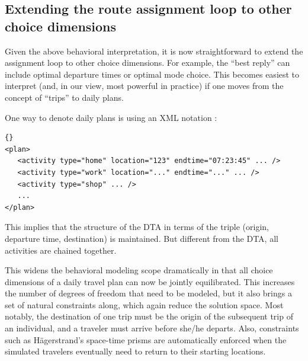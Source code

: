 
\subsection{Extending the route assignment loop to other choice
  dimensions}
\label{sec:extend-route-assignm}

Given the above behavioral interpretation, it is now straightforward
to extend the assignment loop to other choice dimensions.  For
example, the ``best reply'' can include optimal departure times
\citep[e.g.][]{METROPOLIS,EttemaEtcRoutes-timesIatbr03} or optimal mode
choice.  This becomes easiest to interpret (and, in our view, most
powerful in practice) if one moves from the concept of ``trips'' to
daily plans.

One way to denote daily plans is using an
XML notation \citep[][]{xml-www}:
\begin{lstlisting}{}
<plan>
   <activity type="home" location="123" endtime="07:23:45" ... />
   <activity type="work" location="..." endtime="..." ... />
   <activity type="shop" ... />
   ...
</plan>
\end{lstlisting}
This implies that the structure of the DTA in terms of the triple
(origin, departure time, destination) is maintained.  But different from
the DTA, all activities are chained together.

This widens the behavioral modeling scope dramatically in that all
choice dimensions of a daily travel plan can now be jointly
equilibrated. This increases the number of degrees of freedom that
need to be modeled, but it also brings a set of natural constraints
along, which again reduce the solution space. Most notably, the
destination of one trip must be the origin of the subsequent trip of
an individual, and a traveler must arrive before she/he departs.
Also, constraints such as H\"agerstrand's space-time prisms
\citep{Haegerstrand1970WhatAboutPeople} are
automatically enforced when the simulated travelers eventually need
to return to their starting locations.

